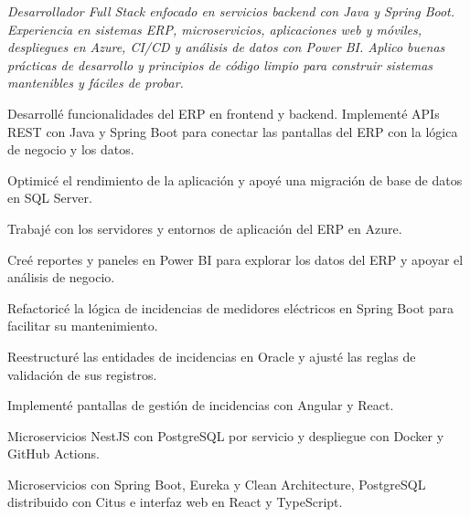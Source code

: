 \documentclass[11pt,spanish]{article}
\begin{document}

\textit{Desarrollador Full Stack enfocado en servicios backend con Java y Spring Boot. Experiencia en sistemas ERP, microservicios, aplicaciones web y móviles, despliegues en Azure, CI/CD y análisis de datos con Power BI. Aplico buenas prácticas de desarrollo y principios de código limpio para construir sistemas mantenibles y fáciles de probar.}

\begin{cvList}
  \item Desarrollé funcionalidades del ERP en frontend y backend. Implementé APIs REST con Java y Spring Boot para conectar las pantallas del ERP con la lógica de negocio y los datos.
  \item Optimicé el rendimiento de la aplicación y apoyé una migración de base de datos en SQL Server.
  \item Trabajé con los servidores y entornos de aplicación del ERP en Azure.
  \item Creé reportes y paneles en Power BI para explorar los datos del ERP y apoyar el análisis de negocio.
\end{cvList}

\begin{cvList}
  \item Refactoricé la lógica de incidencias de medidores eléctricos en Spring Boot para facilitar su mantenimiento.
  \item Reestructuré las entidades de incidencias en Oracle y ajusté las reglas de validación de sus registros.
  \item Implementé pantallas de gestión de incidencias con Angular y React.
\end{cvList}

\begin{cvList}
  \item Microservicios NestJS con PostgreSQL por servicio y despliegue con Docker y GitHub Actions.
\end{cvList}

\begin{cvList}
  \item Microservicios con Spring Boot, Eureka y Clean Architecture, PostgreSQL distribuido con Citus e interfaz web en React y TypeScript.
\end{cvList}
\end{document}
